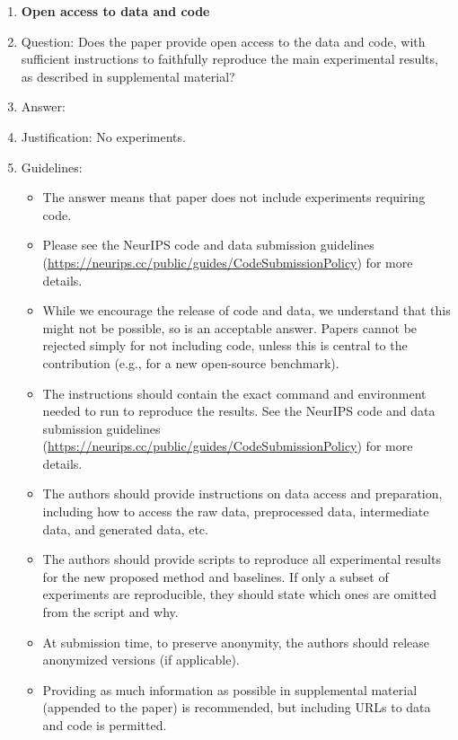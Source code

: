 \documentclass{article}
\numberwithin{theorem}{section}
\theoremstyle{definition}
\begin{document}
\begin{enumerate}
\item {\bf Open access to data and code}
    \item[] Question: Does the paper provide open access to the data and code, with sufficient instructions to faithfully reproduce the main experimental results, as described in supplemental material?
    \item[] Answer: \answerNA{} %
    \item[] Justification: No experiments.
    \item[] Guidelines:
    \begin{itemize}
        \item The answer \answerNA{} means that paper does not include experiments requiring code.
        \item Please see the NeurIPS code and data submission guidelines (\url{https://neurips.cc/public/guides/CodeSubmissionPolicy}) for more details.
        \item While we encourage the release of code and data, we understand that this might not be possible, so \answerNo{} is an acceptable answer. Papers cannot be rejected simply for not including code, unless this is central to the contribution (e.g., for a new open-source benchmark).
        \item The instructions should contain the exact command and environment needed to run to reproduce the results. See the NeurIPS code and data submission guidelines (\url{https://neurips.cc/public/guides/CodeSubmissionPolicy}) for more details.
        \item The authors should provide instructions on data access and preparation, including how to access the raw data, preprocessed data, intermediate data, and generated data, etc.
        \item The authors should provide scripts to reproduce all experimental results for the new proposed method and baselines. If only a subset of experiments are reproducible, they should state which ones are omitted from the script and why.
        \item At submission time, to preserve anonymity, the authors should release anonymized versions (if applicable).
        \item Providing as much information as possible in supplemental material (appended to the paper) is recommended, but including URLs to data and code is permitted.
    \end{itemize}


\end{enumerate}
\end{document}
